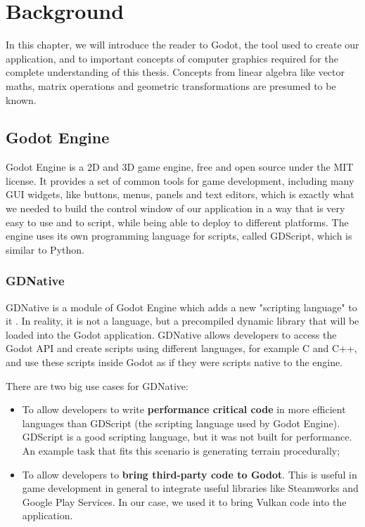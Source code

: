 \chapter{Background}


In this chapter, we will introduce the reader to Godot, the tool used to create our application, and to important concepts of computer graphics required for the complete understanding of this thesis. Concepts from linear algebra like vector maths, matrix operations and geometric transformations are presumed to be known.

\section{Godot Engine}
Godot Engine is a 2D and 3D game engine, free and open source under the MIT license. It provides a set of common tools for game development, including many GUI widgets, like buttons, menus, panels and text editors, which is exactly what we needed to build the control window of our application in a way that is very easy to use and to script, while being able to deploy to different platforms. The engine uses its own programming language for scripts, called GDScript, which is similar to Python.

\subsection{GDNative}
GDNative is a module of Godot Engine which adds a new "scripting language" to it \cite{gdnative_post}. In reality, it is not a language, but a precompiled dynamic library that will be loaded into the Godot application. GDNative allows developers to access the Godot API and create scripts using different languages, for example C and C++,  and use these scripts inside Godot as if they were scripts native to the engine.

There are two big use cases for GDNative:

\begin{itemize}
    \item To allow developers to write \textbf{performance critical code} in more efficient languages than GDScript (the scripting language used by Godot Engine). GDScript is a good scripting language, but it was not built for performance. An example task that fits this scenario is generating terrain procedurally;
    \item To allow developers to \textbf{bring third-party code to Godot}. This is useful in game development in general to integrate useful libraries like Steamworks and Google Play Services. In our case, we used it to bring Vulkan code into the application.
\end{itemize}

